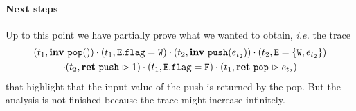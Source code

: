\paragraph{Next steps} Up to this point we have partially prove what we wanted to obtain, \emph{i.e.} the trace
\begin{multline*}
(t_1, \mathbf{inv}\ \mathtt{pop}())\cdot (t_1, \mathtt{E.flag} = \mathtt{W}) \cdot (t_2, \mathbf{inv}\ \mathtt{push}(e_{t_2})) \cdot (t_2, \mathtt{E} = \{\mathtt{W}, e_{t_2}\}) \\
\cdot (t_2, \mathbf{ret}\ \mathtt{push} \vartriangleright 1) \cdot (t_1, \mathtt{E.flag} = \mathtt{F}) \cdot (t_1, \mathbf{ret}\ \mathtt{pop} \vartriangleright e_{t_2})
\end{multline*}
that highlight that the input value of the push is returned by the pop. But the analysis is not finished because the trace might increase infinitely. 


